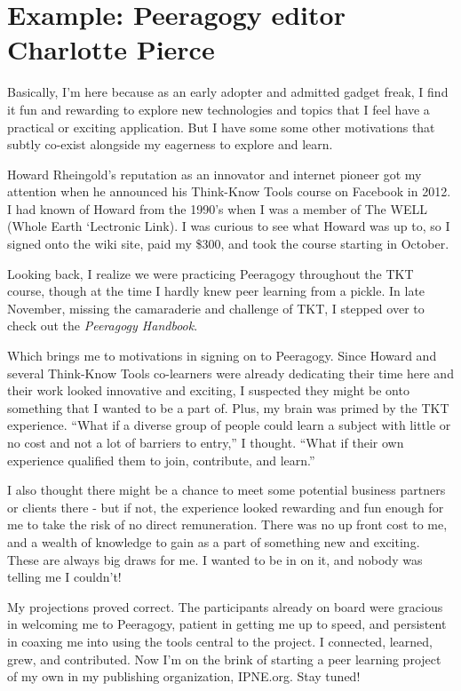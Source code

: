 

\section*{Example: Peeragogy editor Charlotte Pierce}

Basically, I'm here because as an early adopter and admitted gadget
freak, I find it fun and rewarding to explore new technologies and
topics that I feel have a practical or exciting application. But I have
some some other motivations that subtly co-exist alongside my eagerness
to explore and learn.

Howard Rheingold's reputation as an innovator and internet pioneer got
my attention when he announced his Think-Know Tools course on Facebook
in 2012. I had known of Howard from the 1990's when I was a member of
The WELL (Whole Earth `Lectronic Link). I was curious to see what Howard
was up to, so I signed onto the wiki site, paid my \$300, and took the
course starting in October.

Looking back, I realize we were practicing Peeragogy throughout the TKT
course, though at the time I hardly knew peer learning from a pickle. In
late November, missing the camaraderie and challenge of TKT, I stepped
over to check out the \emph{Peeragogy Handbook}.

Which brings me to motivations in signing on to Peeragogy. Since Howard
and several Think-Know Tools co-learners were already dedicating their
time here and their work looked innovative and exciting, I suspected
they might be onto something that I wanted to be a part of. Plus, my
brain was primed by the TKT experience. ``What if a diverse group of
people could learn a subject with little or no cost and not a lot of
barriers to entry,'' I thought. ``What if their own experience qualified
them to join, contribute, and learn.''

I also thought there might be a chance to meet some potential business
partners or clients there - but if not, the experience looked rewarding
and fun enough for me to take the risk of no direct remuneration. There
was no up front cost to me, and a wealth of knowledge to gain as a part
of something new and exciting. These are always big draws for me. I
wanted to be in on it, and nobody was telling me I couldn't!

My projections proved correct. The participants already on board were
gracious in welcoming me to Peeragogy, patient in getting me up to
speed, and persistent in coaxing me into using the tools central to the
project. I connected, learned, grew, and contributed. Now I'm on the
brink of starting a peer learning project of my own in my publishing
organization, IPNE.org. Stay tuned!

